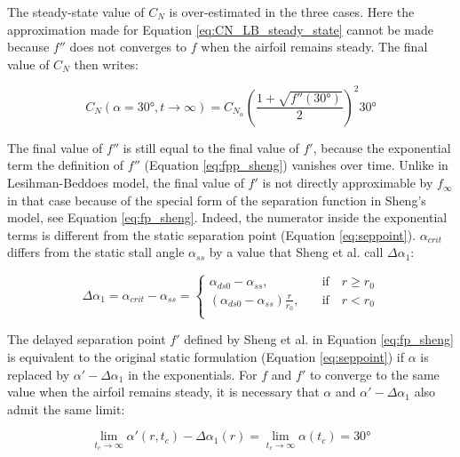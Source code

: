 
The steady-state value of $C_N$ is over-estimated in the three cases. Here the approximation made for Equation \eqref{eq:CN_LB_steady_state} cannot be made because $f''$ does not converges to $f$ when the airfoil remains steady. The final value of $C_N$ then writes: 

\begin{equation}
    C_N(\alpha=\ang{30}, t \rightarrow \infty) = C_{N_{\alpha}}\left(\frac{1+\sqrt{f''(\ang{30})}}{2}\right)^{2} \ang{30}
    \label{eq:CN_ShengLB_steady_state}
\end{equation}

The final value of $f''$ is still equal to the final value of $f'$, because the exponential term the definition of $f''$ (Equation \ref{eq:fpp_sheng}) vanishes over time. Unlike in Lesihman-Beddoes model, the final value of $f'$ is not directly approximable by $f_\infty$ in that case because of the special form of the separation function in Sheng's model, see Equation \eqref{eq:fp_sheng}. Indeed, the numerator inside the exponential terms is different from the static separation point (Equation \eqref{eq:seppoint}). $\alpha_{crit}$ differs from the static stall angle $\alpha_{ss}$ by a value that Sheng et al. call $\Delta \alpha_1$:

\begin{equation}
    \Delta \alpha_1 = \alpha_{crit} - \alpha_{ss} = 
\begin{cases}
\alpha_{ds0}- \alpha_{ss}, &\quad \text{if} \quad r \geq r_0 \\
(\alpha_{ds0}-\alpha_{ss}) \frac{r}{r_0}, &\quad \text{if} \quad r < r_0 \\
\end{cases}
    \label{eq:delta_alpha1}
\end{equation}

The delayed separation point $f'$ defined by Sheng et al. in Equation \eqref{eq:fp_sheng} is equivalent to the original static formulation (Equation \eqref{eq:seppoint}) if $\alpha$ is replaced by $\alpha'-\Delta \alpha_1$ in the exponentials. For $f$ and $f'$ to converge to the same value when the airfoil remains steady, it is necessary that $\alpha$ and $\alpha'-\Delta \alpha_1$ also admit the same limit:

\begin{equation}
    \lim_{t_c \rightarrow \infty}  \alpha'(r,t_c) - \Delta \alpha_1 (r) =  \lim_{t_c \rightarrow \infty} \alpha(t_c) = \ang{30}
    \label{eq:alphas_steady_state}
\end{equation}

